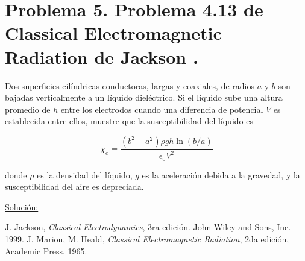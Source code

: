 \documentclass[a4paper,11pt]{article}
\numberwithin{equation}{section}
\begin{document}
\newpage

\section{Problema 5. Problema 4.13 de Classical Electromagnetic Radiation
de Jackson \cite{jackson}.}

Dos superficies cilíndricas conductoras, largas y coaxiales, de radios $a$ y $b$ 
son bajadas verticalmente a un líquido dieléctrico. Si el líquido sube una altura 
promedio de $h$ entre los electrodos cuando una diferencia de potencial $V$ es 
establecida entre ellos, muestre que la susceptibilidad del líquido es 

$$
\chi_e = \frac{(b^2 - a^2)\rho g h \ln{(b/a)}}{\epsilon_0 V^2}
$$

donde $\rho$ es la densidad del líquido, $g$ es la aceleración debida a la gravedad, 
y la susceptibilidad del aire es depreciada.

\vspace{.3cm}

\underline{Solución:} \vspace{.3cm}

\newpage

\begin{thebibliography}{10}
J. Jackson, \emph{Classical Electrodynamics}, 3ra edición. John Wiley and Sons, Inc. 
1999.
J. Marion, M. Heald, \emph{Classical Electromagnetic Radiation}, 2da edición, Academic 
Press, 1965.
\end{thebibliography}
\end{document}
